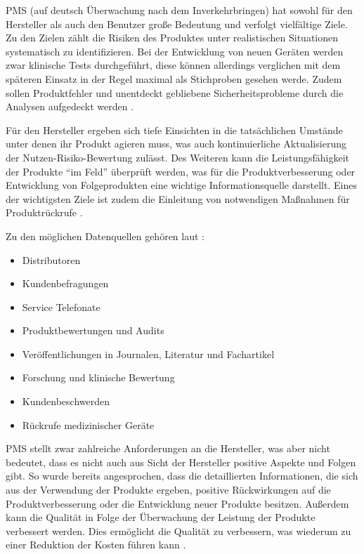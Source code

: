 \documentclass[a4paper,12pt]{report}
\begin{document}
\ac{PMS} (auf deutsch Überwachung nach dem Inverkehrbringen) hat sowohl für den Hersteller als auch den Benutzer große Bedeutung und verfolgt vielfältige Ziele. Zu den Zielen zählt die Risiken des Produktes unter realistischen Situationen systematisch zu identifizieren. Bei der Entwicklung von neuen Geräten werden zwar klinische Tests durchgeführt, diese können allerdings verglichen mit dem späteren Einsatz in der Regel maximal als Stichproben gesehen werde. Zudem sollen Produktfehler und unentdeckt gebliebene Sicherheitsprobleme durch die Analysen aufgedeckt werden \citep[vgl.][]{Johner2017}.

Für den Hersteller ergeben sich tiefe Einsichten in die tatsächlichen Umstände unter denen ihr Produkt agieren muss, was auch kontinuierliche Aktualisierung der Nutzen-Risiko-Bewertung zulässt. Des Weiteren kann die Leistungsfähigkeit der Produkte "`im Feld"' überprüft werden, was für die Produktverbesserung oder Entwicklung von Folgeprodukten eine wichtige Informationsquelle darstellt. Eines der wichtigsten Ziele ist zudem die Einleitung von notwendigen Maßnahmen für Produktrückrufe \citep[vgl.][]{Johner2017}.

Zu den möglichen Datenquellen gehören laut \citep[vgl.][S. 285-288]{Abuhav2012}:
\begin{itemize}
\item Distributoren
\item Kundenbefragungen
\item Service Telefonate
\item Produktbewertungen und Audits
\item Veröffentlichungen in Journalen, Literatur und Fachartikel
\item Forschung und klinische Bewertung
\item Kundenbeschwerden
\item Rückrufe medizinischer Geräte
\end{itemize}

\ac{PMS} stellt zwar zahlreiche Anforderungen an die Hersteller, was aber nicht bedeutet, dass es nicht auch aus Sicht der Hersteller positive Aspekte und Folgen gibt. So wurde bereits angesprochen, dass die detaillierten Informationen, die sich aus der Verwendung der Produkte ergeben, positive Rückwirkungen auf die Produktverbesserung oder die Entwicklung neuer Produkte besitzen. Außerdem kann die Qualität in Folge der Überwachung der Leistung der Produkte verbessert werden. Dies ermöglicht die Qualität zu verbessern, was wiederum zu einer Reduktion der Kosten führen kann \citep[vgl.][S. 2]{Pugh2017}.
\end{document}
